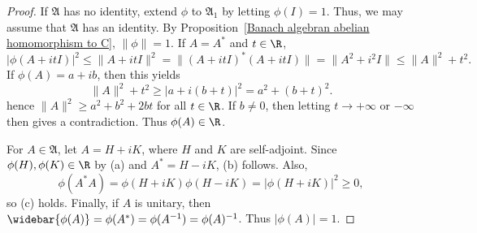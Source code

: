 \begin{proof}
If $\mathfrak{A}$ has no identity, extend $\phi$ to $\mathfrak{A}_1$ by letting $\phi(I)=1$. Thus, we may assume that $\mathfrak{A}$ has an identity. By Proposition~\ref{Banach algebran abelian homomorphism to C}, $\|\phi\|=1$. If $A=A^*$ and $t\in\R$,
\[|\phi(A+itI)|^2\leq\|A+itI\|^2=\|(A+itI)^*(A+itI)\|=\|A^2+i^2I\|\leq\|A\|^2+t^2.\]
If $\phi(A)=a+ib$, then this yields
\[\|A\|^2+t^2\geq|a+i(b+t)|^2=a^2+(b+t)^2.\]
hence $\|A\|^2\geq a^2+b^2+2bt$ for all $t\in\R$. If $b\neq 0$, then letting $t\to+\infty$ or $-\infty$ then gives a contradiction. Thus $\phi(A)\in\R$.\par
For $A\in\mathfrak{A}$, let $A=H+iK$, where $H$ and $K$ are self-adjoint. Since $\phi(H),\phi(K)\in\R$ by (a) and $A^*=H-iK$, (b) follows. Also,
\[\phi(A^*A)=\phi(H+iK)\phi(H-iK)=|\phi(H+iK)|^2\geq 0,\]
so (c) holds. Finally, if $A$ is unitary, then $\widebar{\phi(A)}=\phi(A^*)=\phi(A^{-1})=\phi(A)^{-1}$. Thus $|\phi(A)|=1$.
\end{proof}
